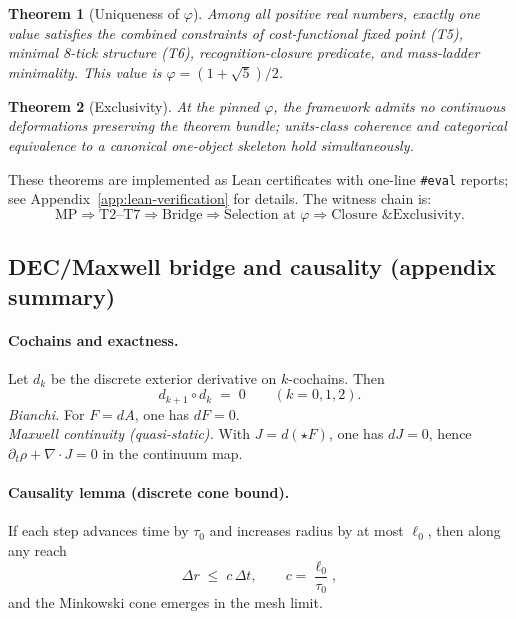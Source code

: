 \documentclass[11pt]{article}
\newtheorem{theorem}{Theorem}[section]
\begin{document}
\begin{theorem}[Uniqueness of $\varphi$]\label{thm:RecognitionRealityUnique}
Among all positive real numbers, exactly one value satisfies the combined constraints of cost-functional fixed point (T5), minimal 8-tick structure (T6), recognition-closure predicate, and mass-ladder minimality. This value is $\varphi=(1+\sqrt{5})/2$.
\end{theorem}

\begin{theorem}[Exclusivity]\label{thm:UltimateClosure}
At the pinned $\varphi$, the framework admits no continuous deformations preserving the theorem bundle; units-class coherence and categorical equivalence to a canonical one-object skeleton hold simultaneously.
\end{theorem}

\noindent These theorems are implemented as Lean certificates with one-line \texttt{\#eval} reports; see Appendix~\ref{app:lean-verification} for details. The witness chain is:
\[
\text{MP} \Rightarrow \text{T2--T7} \Rightarrow \text{Bridge} \Rightarrow \text{Selection at }\varphi \Rightarrow \text{Closure \& Exclusivity}.
\]
%  

\subsection{DEC/Maxwell bridge and causality (appendix summary)}\label{subsec:dec-maxwell-causality}

\paragraph{Cochains and exactness.}
Let $d_k$ be the discrete exterior derivative on $k$-cochains. Then
\[
d_{k+1}\!\circ d_k \;=\; 0 \qquad (k=0,1,2).
\]
\emph{Bianchi.} For $F=dA$, one has $dF=0$. \\
\emph{Maxwell continuity (quasi-static).} With $J = d(\star F)$, one has $dJ=0$, hence \(\partial_t \rho+\nabla\!\cdot\!J=0\) in the continuum map.

\paragraph{Causality lemma (discrete cone bound).}
If each step advances time by $\tau_0$ and increases radius by at most $\ell_0$, then along any reach
\[
\Delta r \;\le\; c\,\Delta t,\qquad c=\frac{\ell_0}{\tau_0},
\]
and the Minkowski cone emerges in the mesh limit.
\end{document}
